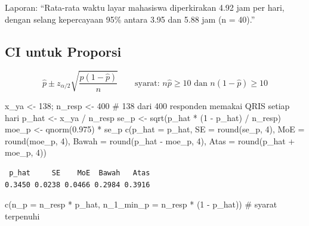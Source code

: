 \documentclass[
  indonesian,
  letterpaper,
]{book}
\newenvironment{Shaded}{\begin{snugshade}}{\end{snugshade}}
\newcommand{\AttributeTok}[1]{\textcolor[rgb]{0.40,0.45,0.13}{#1}}
\newcommand{\CommentTok}[1]{\textcolor[rgb]{0.37,0.37,0.37}{#1}}
\newcommand{\DecValTok}[1]{\textcolor[rgb]{0.68,0.00,0.00}{#1}}
\newcommand{\FloatTok}[1]{\textcolor[rgb]{0.68,0.00,0.00}{#1}}
\newcommand{\FunctionTok}[1]{\textcolor[rgb]{0.28,0.35,0.67}{#1}}
\newcommand{\NormalTok}[1]{\textcolor[rgb]{0.00,0.23,0.31}{#1}}
\newcommand{\OtherTok}[1]{\textcolor[rgb]{0.00,0.23,0.31}{#1}}
\newcommand{\SpecialCharTok}[1]{\textcolor[rgb]{0.37,0.37,0.37}{#1}}
\begin{document}
Laporan: ``Rata-rata waktu layar mahasiswa diperkirakan 4.92 jam per
hari, dengan selang kepercayaan 95\% antara 3.95 dan 5.88 jam (n =
40).''

\subsection{CI untuk Proporsi}\label{ci-untuk-proporsi}

\[\hat{p} \pm z_{\alpha/2}\sqrt{\dfrac{\hat{p}(1-\hat{p})}{n}} \qquad \text{syarat: } n\hat{p} \geq 10 \text{ dan } n(1-\hat{p}) \geq 10\]

\begin{Shaded}
\begin{Highlighting}[]
\NormalTok{x\_ya }\OtherTok{\textless{}{-}} \DecValTok{138}\NormalTok{; n\_resp }\OtherTok{\textless{}{-}} \DecValTok{400} \CommentTok{\# 138 dari 400 responden memakai QRIS setiap hari}
\NormalTok{p\_hat }\OtherTok{\textless{}{-}}\NormalTok{ x\_ya }\SpecialCharTok{/}\NormalTok{ n\_resp}
\NormalTok{se\_p }\OtherTok{\textless{}{-}} \FunctionTok{sqrt}\NormalTok{(p\_hat }\SpecialCharTok{*}\NormalTok{ (}\DecValTok{1} \SpecialCharTok{{-}}\NormalTok{ p\_hat) }\SpecialCharTok{/}\NormalTok{ n\_resp)}
\NormalTok{moe\_p }\OtherTok{\textless{}{-}} \FunctionTok{qnorm}\NormalTok{(}\FloatTok{0.975}\NormalTok{) }\SpecialCharTok{*}\NormalTok{ se\_p}
\FunctionTok{c}\NormalTok{(}\AttributeTok{p\_hat =}\NormalTok{ p\_hat, }\AttributeTok{SE =} \FunctionTok{round}\NormalTok{(se\_p, }\DecValTok{4}\NormalTok{), }\AttributeTok{MoE =} \FunctionTok{round}\NormalTok{(moe\_p, }\DecValTok{4}\NormalTok{),}
\AttributeTok{Bawah =} \FunctionTok{round}\NormalTok{(p\_hat }\SpecialCharTok{{-}}\NormalTok{ moe\_p, }\DecValTok{4}\NormalTok{), }\AttributeTok{Atas =} \FunctionTok{round}\NormalTok{(p\_hat }\SpecialCharTok{+}\NormalTok{ moe\_p, }\DecValTok{4}\NormalTok{))}
\end{Highlighting}
\end{Shaded}

\begin{verbatim}
 p_hat     SE    MoE  Bawah   Atas 
0.3450 0.0238 0.0466 0.2984 0.3916 
\end{verbatim}

\begin{Shaded}
\begin{Highlighting}[]
\FunctionTok{c}\NormalTok{(}\AttributeTok{n\_p =}\NormalTok{ n\_resp }\SpecialCharTok{*}\NormalTok{ p\_hat, }\AttributeTok{n\_1\_min\_p =}\NormalTok{ n\_resp }\SpecialCharTok{*}\NormalTok{ (}\DecValTok{1} \SpecialCharTok{{-}}\NormalTok{ p\_hat)) }\CommentTok{\# syarat terpenuhi}
\end{Highlighting}
\end{Shaded}
\end{document}
